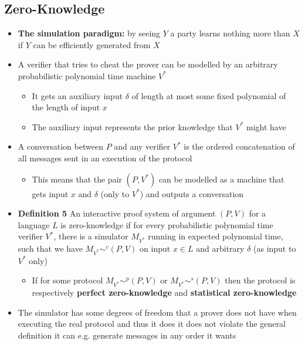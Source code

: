 \subsection{Zero-Knowledge}
\begin{itemize}
  \item \textbf{The simulation paradigm:} by seeing $Y$ a party learns nothing more than $X$ if $Y$ can be efficiently generated from $X$
  \item A verifier that tries to cheat the prover can be modelled by an arbitrary probabilistic polynomial time machine $V^*$
  \begin{itemize}
  	\item It gets an auxiliary input $\delta$ of length at most some fixed polynomial of the length of input $x$
  	\item The auxiliary input represents the prior knowledge that $V^*$ might have
  \end{itemize}

  \item A conversation between $P$ and any verifier $V^*$ is the ordered concatenation of all messages sent in an execution of the protocol
  \begin{itemize}
  	\item This means that the pair $(P,V^*)$ can be modelled as a machine that gets input $x$ and $\delta$ (only to $V^*$) and outputs a conversation
  \end{itemize}
		
  \item \textbf{Definition 5} An interactive proof system of argument $(P,V)$ for a language $L$ is zero-knowledge if for every probabilistic polynomial time verifier $V^*$, there is a simulator $M_{V^*}$ running in expected polynomial time, such that we have $M_{V^*} \sim^c (P,V)$ on input $x \in L$ and arbitrary $\delta$ (as input to $V^*$ only)
    \begin{itemize}
      \item If for some protocol $M_{V^*} \sim^p (P,V)$ or $M_{V^*} \sim^s (P,V)$ then the protocol is respectively \textbf{perfect zero-knowledge} and \textbf{statistical zero-knowledge}
  \end{itemize}
  \item The simulator has some degrees of freedom that a prover does not have when executing the real protocol and thus it does it does not violate the general definition it can e.g. generate messages in any order it wants
\end{itemize}

